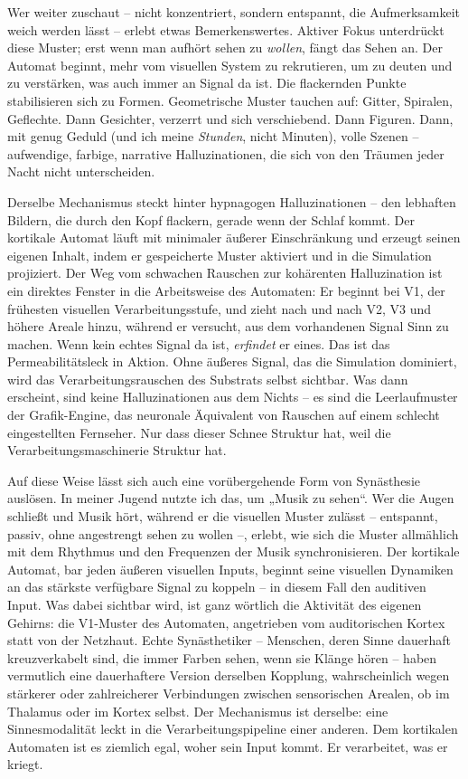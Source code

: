 \documentclass[11pt, twoside, openright]{book}
\begin{document}
Wer weiter zuschaut -- nicht konzentriert, sondern entspannt, die Aufmerksamkeit weich werden lässt -- erlebt etwas Bemerkenswertes. Aktiver Fokus unterdrückt diese Muster; erst wenn man aufhört sehen zu \textit{wollen}, fängt das Sehen an. Der Automat beginnt, mehr vom visuellen System zu rekrutieren, um zu deuten und zu verstärken, was auch immer an Signal da ist. Die flackernden Punkte stabilisieren sich zu Formen. Geometrische Muster tauchen auf: Gitter, Spiralen, Geflechte. Dann Gesichter, verzerrt und sich verschiebend. Dann Figuren. Dann, mit genug Geduld (und ich meine \textit{Stunden}, nicht Minuten), volle Szenen -- aufwendige, farbige, narrative Halluzinationen, die sich von den Träumen jeder Nacht nicht unterscheiden.

Derselbe Mechanismus steckt hinter hypnagogen Halluzinationen -- den lebhaften Bildern, die durch den Kopf flackern, gerade wenn der Schlaf kommt. Der kortikale Automat läuft mit minimaler äußerer Einschränkung und erzeugt seinen eigenen Inhalt, indem er gespeicherte Muster aktiviert und in die Simulation projiziert. Der Weg vom schwachen Rauschen zur kohärenten Halluzination ist ein direktes Fenster in die Arbeitsweise des Automaten: Er beginnt bei V1, der frühesten visuellen Verarbeitungsstufe, und zieht nach und nach V2, V3 und höhere Areale hinzu, während er versucht, aus dem vorhandenen Signal Sinn zu machen. Wenn kein echtes Signal da ist, \textit{erfindet} er eines. Das ist das Permeabilitätsleck in Aktion. Ohne äußeres Signal, das die Simulation dominiert, wird das Verarbeitungsrauschen des Substrats selbst sichtbar. Was dann erscheint, sind keine Halluzinationen aus dem Nichts -- es sind die Leerlaufmuster der Grafik-Engine, das neuronale Äquivalent von Rauschen auf einem schlecht eingestellten Fernseher. Nur dass dieser Schnee Struktur hat, weil die Verarbeitungsmaschinerie Struktur hat.

Auf diese Weise lässt sich auch eine vorübergehende Form von Synästhesie auslösen. In meiner Jugend nutzte ich das, um „Musik zu sehen“. Wer die Augen schließt und Musik hört, während er die visuellen Muster zulässt -- entspannt, passiv, ohne angestrengt sehen zu wollen --, erlebt, wie sich die Muster allmählich mit dem Rhythmus und den Frequenzen der Musik synchronisieren. Der kortikale Automat, bar jeden äußeren visuellen Inputs, beginnt seine visuellen Dynamiken an das stärkste verfügbare Signal zu koppeln -- in diesem Fall den auditiven Input. Was dabei sichtbar wird, ist ganz wörtlich die Aktivität des eigenen Gehirns: die V1-Muster des Automaten, angetrieben vom auditorischen Kortex statt von der Netzhaut. Echte Synästhetiker -- Menschen, deren Sinne dauerhaft kreuzverkabelt sind, die immer Farben sehen, wenn sie Klänge hören -- haben vermutlich eine dauerhaftere Version derselben Kopplung, wahrscheinlich wegen stärkerer oder zahlreicherer Verbindungen zwischen sensorischen Arealen, ob im Thalamus oder im Kortex selbst. Der Mechanismus ist derselbe: eine Sinnesmodalität leckt in die Verarbeitungspipeline einer anderen. Dem kortikalen Automaten ist es ziemlich egal, woher sein Input kommt. Er verarbeitet, was er kriegt.
\end{document}
